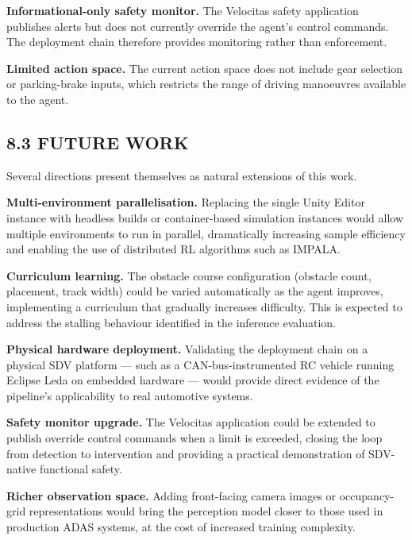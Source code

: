 \documentclass[12pt,a4paper]{article}
\begin{document}
\textbf{Informational-only safety monitor.} The Velocitas safety application
publishes alerts but does not currently override the agent's control commands.
The deployment chain therefore provides monitoring rather than enforcement.

\textbf{Limited action space.} The current action space does not include gear
selection or parking-brake inputs, which restricts the range of driving
manoeuvres available to the agent.

\subsection*{8.3 \quad FUTURE WORK}

\indent Several directions present themselves as natural extensions of this work.

\textbf{Multi-environment parallelisation.} Replacing the single Unity Editor
instance with headless builds or container-based simulation instances would
allow multiple environments to run in parallel, dramatically increasing sample
efficiency and enabling the use of distributed RL algorithms such as IMPALA.

\textbf{Curriculum learning.} The obstacle course configuration (obstacle
count, placement, track width) could be varied automatically as the agent
improves, implementing a curriculum that gradually increases difficulty.
This is expected to address the stalling behaviour identified in the
inference evaluation.

\textbf{Physical hardware deployment.} Validating the deployment chain on
a physical SDV platform --- such as a CAN-bus-instrumented RC vehicle
running Eclipse Leda on embedded hardware --- would provide direct evidence
of the pipeline's applicability to real automotive systems.

\textbf{Safety monitor upgrade.} The Velocitas application could be extended
to publish override control commands when a limit is exceeded, closing the
loop from detection to intervention and providing a practical demonstration
of SDV-native functional safety.

\textbf{Richer observation space.} Adding front-facing camera images or
occupancy-grid representations would bring the perception model closer to
those used in production ADAS systems, at the cost of increased training
complexity.

\clearpage

\end{document}
